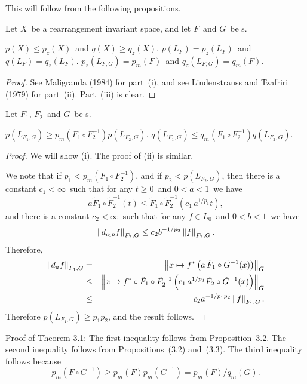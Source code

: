 This will follow from the following propositions.

\begin{prop} Let $X$\ be a rearrangement invariant space, and let
$F$\ and $G$\ be \phifunction s.
\begin{itemrom}
\itemi $p(X) \le p_z(X)$\ and $q(X) \ge q_z(X)$.
\itemii $p(L_F) = p_z(L_F)$\ and $q(L_F) = q_z(L_F)$.
\itemiii $p_z(L_{F,G}) = p_m(F)$\ and $q_z(L_{F,G}) = q_m(F)$.
\end{itemrom}
\end{prop}

\begin{proof}
See Maligranda (1984) for part~(i), and see 
Lindenstrauss and Tzafriri (1979) for
part~(ii). Part~(iii) is clear.
\end{proof}

\begin{prop} Let $F_1$, $F_2$\ and $G$\ be \phifunction s. 
\begin{itemrom}
\itemi  $p(L_{F_1,G}) \ge p_m(F_1\circ F_2^{-1}) p(L_{F_2,G})$.
\itemii $q(L_{F_1,G}) \le q_m(F_1\circ F_2^{-1}) q(L_{F_2,G})$.
\end{itemrom}
\end{prop}

\begin{proof}
We will show (i). The proof of (ii) is similar. 

We note that if $p_1 < p_m(F_1\circ F_2^{-1})$, and if $p_2 < p(L_{F_2,G})$,
then there is a constant $c_1<\infty$\ such that for any $t\ge 0$\  and
$0<a<1$\ we have
$$ a \tilde F_1\circ\tilde F_2^{-1}(t)
   \le \tilde F_1\circ\tilde F_2^{-1}(c_1\,a^{1/p_1} t) ,$$
and there is a constant $c_2 < \infty$\ such that for any $f\in L_0$\ and
$0<b<1$\ we have
$$ \left\| d_{c_1 b}f \right\|_{F_2,G} \le c_2 b^{-1/p_2} \left\| f \right\|_{F_2,G} . $$
Therefore,
\begin{eqnarray*}
   \left\| d_a f \right\|_{F_1,G}
   &=& \left\|  x\mapsto f^*\left( a\, 
   \tilde F_1\circ\tilde G^{-1}(x) \right) \right\|_G \\
   &\le& \left\|  x\mapsto f^*\circ \tilde F_1\circ \tilde F_2^{-1}\left(
   c_1\,a^{1/p_1}
   \tilde F_2\circ\tilde G^{-1}(x) \right) \right\|_G \\
   &\le& c_2 a^{-1/p_1 p_2} \left\| f \right\|_{F_1,G} . 
\end{eqnarray*}
Therefore $p(L_{F_1,G}) \ge p_1 p_2$, and the result follows.
\end{proof}

\noindent
Proof of Theorem 3.1: The first inequality follows from Proposition~3.2. The
second inequality follows from Propositions~(3.2) and~(3.3). The third 
inequality
follows because
$$ p_m(F\circ G^{-1}) \ge p_m(F) p_m(G^{-1}) = p_m(F)/q_m(G) .$$
\endproof

